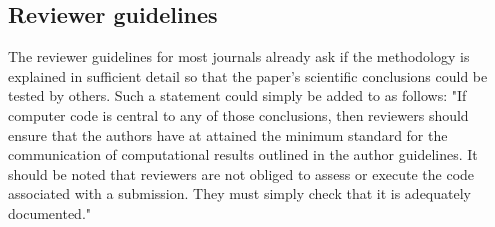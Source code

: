 \subsection{Reviewer guidelines}

The reviewer guidelines for most journals already ask if the methodology is explained in sufficient detail so that the paper's scientific conclusions could be tested by others. Such a statement could simply be added to as follows: "If computer code is central to any of those conclusions, then reviewers should ensure that the authors have at attained the minimum standard for the communication of computational results outlined in the author guidelines. It should be noted that reviewers are not obliged to assess or execute the code associated with a submission. They must simply check that it is adequately documented."   